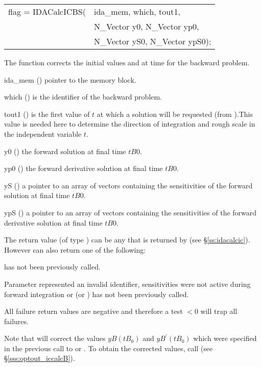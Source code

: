 {
  \begin{tabular}[t]{@{}r@{}l@{}}
  flag = IDACalcICBS(&ida\_mem, which, tout1, \\
                     &N\_Vector y0, N\_Vector yp0, \\
                     &N\_Vector yS0, N\_Vector ypS0);
  \end{tabular}
}
{
  The function  corrects the initial values  and  at
  time  for the backward problem.
}
{
  \begin{args}
  \item[ida\_mem] ()
    pointer to the {\idas} memory block.
  \item[which] ()
    is the identifier of the backward problem.
  \item[tout1] ()
    is the first value of $t$ at which a solution will be requested (from
    ).This value is needed here to determine the direction of
    integration and rough scale in the independent variable $t$.   
  \item[y0] ()
    the forward solution at final time $tB0$.
  \item[yp0] ()
    the forward derivative solution at final time $tB0$.
  \item[yS]  ()
    a pointer to an array of  vectors containing the sensitivities of 
    the forward solution at final time $tB0$.
  \item[ypS]  ()
    a pointer to an array of  vectors containing the sensitivities of 
    the forward derivative solution at final time $tB0$.

  \end{args}
}
{
  The return value  (of type ) can be any that is returned by 
   (see \S\ref{ss:idacalcic}). However  can also 
  return one of the following:

  \begin{args}
  \item[\Id{IDA\_NO\_ADJ}]
     has not been previously called.
  \item[\id{IDA\_ILL\_INPUT}]
    Parameter  represented an invalid identifier, sensitivities were
    not active during forward integration or  (or )
    has not been previously called.
  \end{args} 
}
{
  All failure return values are negative and therefore a test  $< 0$
  will trap all  failures.

  Note that  will correct the values $yB(tB_0)$ and 
  $yB^\prime(tB_0)$ which were specified in the previous call to  
  or . To obtain the corrected values, call 
   (see \S\ref{sss:optout_iccalcB}).
}



